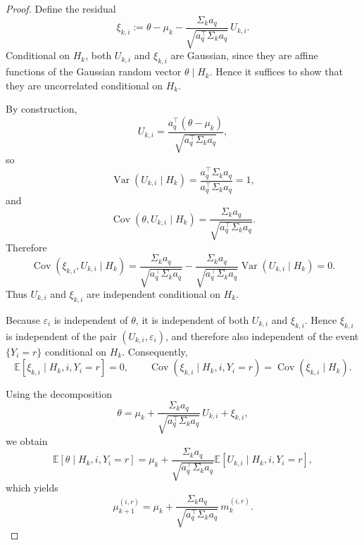 \documentclass{article}
\begin{document}
\begin{proof}
Define the residual
\begin{equation*}
\xi_{k,i}
:=
\theta-\mu_k-\frac{\Sigma_k a_q}{\sqrt{a_q^\top\Sigma_k a_q}}\,U_{k,i}.
\end{equation*}
Conditional on $H_k$, both $U_{k,i}$ and $\xi_{k,i}$ are Gaussian, since they are affine
functions of the Gaussian random vector $\theta\mid H_k$. Hence it suffices to show that they
are uncorrelated conditional on $H_k$.

By construction,
\begin{equation*}
U_{k,i}
=
\frac{a_q^\top(\theta-\mu_k)}{\sqrt{a_q^\top\Sigma_k a_q}},
\end{equation*}
so
\begin{equation*}
\operatorname{Var}(U_{k,i}\mid H_k)
=
\frac{a_q^\top\Sigma_k a_q}{a_q^\top\Sigma_k a_q}
=1,
\end{equation*}
and
\begin{equation*}
\operatorname{Cov}(\theta,U_{k,i}\mid H_k)
=
\frac{\Sigma_k a_q}{\sqrt{a_q^\top\Sigma_k a_q}}.
\end{equation*}
Therefore
\begin{equation*}
\operatorname{Cov}(\xi_{k,i},U_{k,i}\mid H_k)
=
\frac{\Sigma_k a_q}{\sqrt{a_q^\top\Sigma_k a_q}}
-
\frac{\Sigma_k a_q}{\sqrt{a_q^\top\Sigma_k a_q}}
\operatorname{Var}(U_{k,i}\mid H_k)
=0.
\end{equation*}
Thus $U_{k,i}$ and $\xi_{k,i}$ are independent conditional on $H_k$.

Because $\varepsilon_i$ is independent of $\theta$, it is independent of both $U_{k,i}$ and
$\xi_{k,i}$. Hence $\xi_{k,i}$ is independent of the pair $(U_{k,i},\varepsilon_i)$, and therefore
also independent of the event $\{Y_i=r\}$ conditional on $H_k$. Consequently,
\begin{equation*}
\mathbb E[\xi_{k,i}\mid H_k,i,Y_i=r]=0,
\qquad
\operatorname{Cov}(\xi_{k,i}\mid H_k,i,Y_i=r)=\operatorname{Cov}(\xi_{k,i}\mid H_k).
\end{equation*}

Using the decomposition
\begin{equation*}
\theta
=
\mu_k
+
\frac{\Sigma_k a_q}{\sqrt{a_q^\top\Sigma_k a_q}}\,U_{k,i}
+
\xi_{k,i},
\end{equation*}
we obtain
\begin{equation*}
\mathbb E[\theta\mid H_k,i,Y_i=r]
=
\mu_k+
\frac{\Sigma_k a_q}{\sqrt{a_q^\top\Sigma_k a_q}}
\mathbb E[U_{k,i}\mid H_k,i,Y_i=r],
\end{equation*}
which yields
\begin{equation*}
\mu_{k+1}^{(i,r)}
=
\mu_k+
\frac{\Sigma_k a_q}{\sqrt{a_q^\top\Sigma_k a_q}}\,m_{k}^{(i,r)}.
\end{equation*}


\end{proof}
\end{document}
